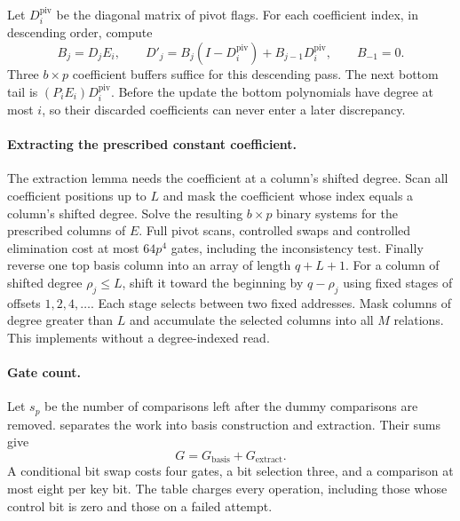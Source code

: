 \documentclass[b5paper, 10pt, abstract=true, captions=tableheading]{scrartcl}
\theoremstyle{plain}
\theoremstyle{definition}
\begin{document}
Let $D_i^{\mathrm{piv}}$ be the diagonal matrix of pivot flags. For each
coefficient index, in descending order, compute
\[
 B_j=D_jE_i,\qquad
 D'_j=B_j(I-D_i^{\mathrm{piv}})+B_{j-1}D_i^{\mathrm{piv}},\qquad B_{-1}=0.
\]
Three $b\times p$ coefficient buffers suffice for this descending pass.
The next bottom tail is $(P_iE_i)D_i^{\mathrm{piv}}$. Before the update the
bottom polynomials have degree at most $i$, so their discarded
coefficients can never enter a later discrepancy.

\paragraph{Extracting the prescribed constant coefficient.}
The extraction lemma needs the coefficient at a column's shifted degree.
Scan all coefficient positions up to $L$ and mask the
coefficient whose index equals a column's shifted degree. Solve the
resulting $b\times p$ binary systems for the prescribed columns of $E$.
Full pivot scans, controlled swaps and controlled elimination cost at most
$64p^4$ gates, including the inconsistency test. Finally reverse one top
basis column into an array of length $q+L+1$. For a column of shifted
degree $\rho_j\leq L$, shift it toward the beginning by $q-\rho_j$
using fixed stages of offsets $1,2,4,\ldots$. Each stage selects
between two fixed addresses. Mask columns of degree greater than $L$ and
accumulate the selected columns into all $M$ relations. This implements
 without a degree-indexed read.

\paragraph{Gate count.}
Let $s_p$ be the number of comparisons left after the dummy comparisons
are removed.  separates the work into
basis construction and extraction. Their sums give
\begin{equation}\label{eq:wopt-generator}
 G=G_{\mathrm{basis}}+G_{\mathrm{extract}}.
\end{equation}
A conditional bit swap costs four gates, a bit selection three, and a
comparison at most eight per key bit. The table charges every operation,
including those whose control bit is zero and those on a failed attempt.
\end{document}
